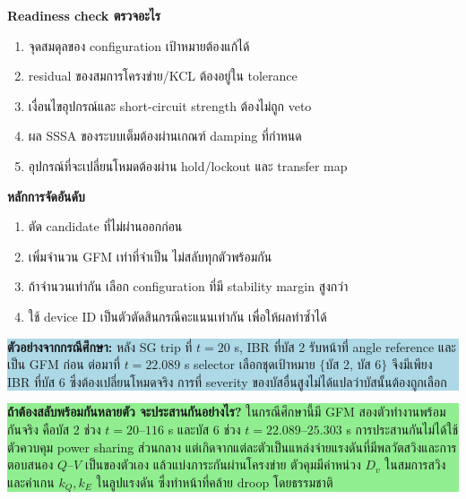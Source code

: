 \documentclass[12pt,a4paper]{article}
\begin{document}
\begin{minipage}[t]{0.49\textwidth}
\textbf{Readiness check ตรวจอะไร}
\begin{enumerate}
  \item จุดสมดุลของ configuration เป้าหมายต้องแก้ได้
  \item residual ของสมการโครงข่าย/KCL ต้องอยู่ใน tolerance
  \item เงื่อนไขอุปกรณ์และ short-circuit strength ต้องไม่ถูก veto
  \item ผล SSSA ของระบบเต็มต้องผ่านเกณฑ์ damping ที่กำหนด
  \item อุปกรณ์ที่จะเปลี่ยนโหมดต้องผ่าน hold/lockout และ transfer map
\end{enumerate}
\end{minipage}\hfill
\begin{minipage}[t]{0.49\textwidth}
\textbf{หลักการจัดอันดับ}
\begin{enumerate}
  \item ตัด candidate ที่ไม่ผ่านออกก่อน
  \item เพิ่มจำนวน GFM เท่าที่จำเป็น ไม่สลับทุกตัวพร้อมกัน
  \item ถ้าจำนวนเท่ากัน เลือก configuration ที่มี stability margin สูงกว่า
  \item ใช้ device ID เป็นตัวตัดสินกรณีคะแนนเท่ากัน เพื่อให้ผลทำซ้ำได้
\end{enumerate}
\end{minipage}

\vspace{5pt}
\noindent\colorbox{lightblue}{\parbox{\dimexpr\textwidth-2\fboxsep\relax}{\small\textbf{ตัวอย่างจากกรณีศึกษา:} หลัง SG trip ที่ $t=20$ s, IBR ที่บัส 2 รับหน้าที่ angle reference และเป็น GFM ก่อน ต่อมาที่ $t=22.089$ s selector เลือกชุดเป้าหมาย $\{$บัส 2, บัส 6$\}$ จึงมีเพียง IBR ที่บัส 6 ซึ่งต้องเปลี่ยนโหมดจริง การที่ severity ของบัสอื่นสูงไม่ได้แปลว่าบัสนั้นต้องถูกเลือก}}

\vspace{4pt}
\noindent\colorbox{lightgreen}{\parbox{\dimexpr\textwidth-2\fboxsep\relax}{\small\textbf{ถ้าต้องสลับพร้อมกันหลายตัว จะประสานกันอย่างไร?} ในกรณีศึกษานี้มี GFM สองตัวทำงานพร้อมกันจริง คือบัส 2 ช่วง $t=20$--$116$ s และบัส 6 ช่วง $t=22.089$--$25.303$ s การประสานกันไม่ได้ใช้ตัวควบคุม power sharing ส่วนกลาง แต่เกิดจากแต่ละตัวเป็นแหล่งจ่ายแรงดันที่มีพลวัตสวิงและการตอบสนอง $Q$--$V$ เป็นของตัวเอง แล้วแบ่งภาระกันผ่านโครงข่าย ตัวคุมมีค่าหน่วง $D_v$ ในสมการสวิงและค่าเกน $k_Q,k_E$ ในลูปแรงดัน ซึ่งทำหน้าที่คล้าย droop โดยธรรมชาติ}}
\end{document}
